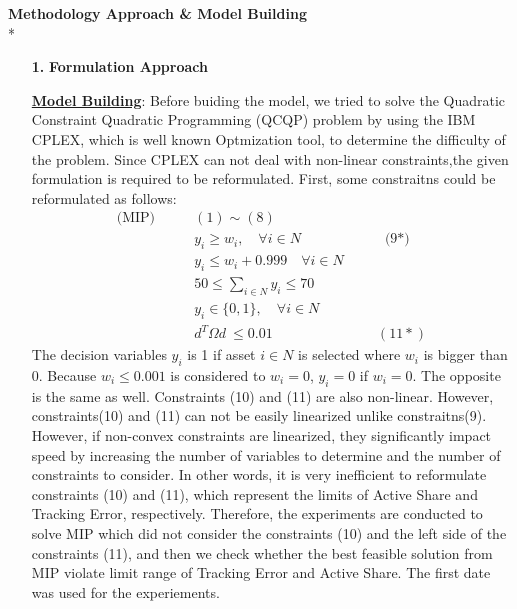 \documentclass[11pt]{article}
\begin{document}
\textbf{Methodology Approach {\&} Model Building}\\*
\begin{itemize}
\item[\textbf{1.}] \textbf{Formulation Approach}
	\item[] \underline{\textbf{Model Building}}:
	Before buiding the model, we tried to solve the  Quadratic Constraint Quadratic Programming (QCQP)  problem by using the IBM CPLEX, which is well known Optmization tool, to determine the difficulty of the problem. Since CPLEX can not deal with non-linear constraints,the given formulation is required to be reformulated. 
	First, some constraitns could be reformulated as follows:
	\begin{align*}
	\text{(MIP)} \quad \quad &(1) \sim (8) \\
    & y_i \geq w_i, \quad \forall i \in N    \quad \quad \quad  \quad  \quad  \quad\text{(9*)}\\
	& y_i \leq w_i + 0.999 \quad \forall i \in N \\
	& 50 \leq \sum_{i \in N} y_i \leq 70 \\
	& y_i \in \{0,1\}, \quad \forall i \in N \\
	&  d^T\Omega  d \  \leq 0.01  \quad  \quad  \quad  \quad \quad \ \ \quad \quad(11*)
	\end{align*} 
	The decision variables $y_i$ is 1 if asset $i \in N$ is selected where $w_i$ is bigger than 0. Because $w_i \leq 0.001$ is considered to $w_i = 0$,  $y_i = 0$ if $w_i = 0$. The opposite is the same as well. Constraints (10) and (11) are also non-linear. However, constraints(10) and (11) can not be easily linearized unlike constraitns(9). However, if non-convex constraints are linearized, they significantly impact speed by increasing the number of variables to determine and the number of constraints to consider. In other words, it is very inefficient to reformulate constraints (10) and (11), which represent the limits of Active Share and Tracking Error, respectively. Therefore, the experiments are conducted to solve MIP which did not consider the constraints (10) and the left side of the constraints (11), and then we check whether the best feasible solution from MIP violate limit range of Tracking Error and Active Share. The first date was used for the experiements.  
	

\end{itemize}
\end{document}
